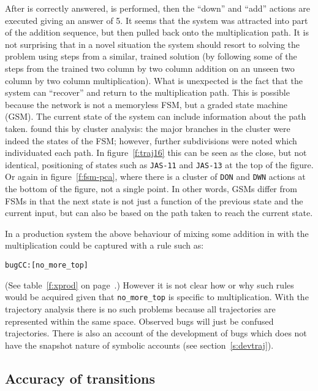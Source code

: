 After  is correctly answered,  is performed, then the ``down'' and
``add'' actions are executed giving an answer of 5.  It seems that the
system was attracted into part of the addition sequence, but then pulled
back onto the multiplication path.  It is not surprising that in a novel
situation the system should resort to solving the problem using steps
from a similar, trained solution (by following some of the steps from the
trained two column by two column addition on an unseen two column by two
column multiplication).  What is unexpected is the fact that the system can
``recover'' and return to the multiplication path.  This is possible
because the network is not a memoryless FSM, but a graded state
machine (GSM).
The current state of the system can include information about the path
taken.   found this by cluster analysis: the major branches
in the cluster were indeed the states of the FSM; however, further
subdivisions were noted which individuated each path.  In
figure~\ref{f:traj16} this can be seen as the close, but not identical,
positioning of states such as \verb|JAS-11| and \verb|JAS-13| at the top of
the figure.  Or again in figure~\ref{f:fsm-pca}, where there is a cluster
of \verb|DON| and \verb|DWN| actions at the bottom of the figure, not a
single point.  In other words, GSMs differ from FSMs in that the next state
is not just a function of the previous state and the current input, but can
also be based on the path taken to reach the current state.


In a production system the
above behaviour of mixing some addition in
with the multiplication could be captured with a rule such as:
\begin{alltt}
    bugCC:  [no_more_top] \anarrow [startadd]
\end{alltt}
(See table~\ref{f:xprod} on page~\pageref{f:xprod}.)  However it is not
clear how or why such rules would be acquired given that \verb|no_more_top|
is specific to multiplication.  With the trajectory analysis there is no
such problems because all trajectories are represented within the same
space.  Observed bugs will just be confused trajectories.  There is also an
account of the development of bugs which does not have the snapshot nature
of symbolic accounts (see section~\ref{s:devtraj}).


\subsection{Accuracy of transitions}

